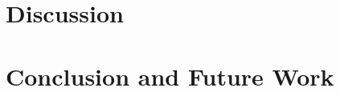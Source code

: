 \documentclass[graybox]{svmult}
\begin{document}
\section{Discussion}
\label{sec:5}



\section{Conclusion and Future Work}
\label{sec:6}

%
\end{document}
